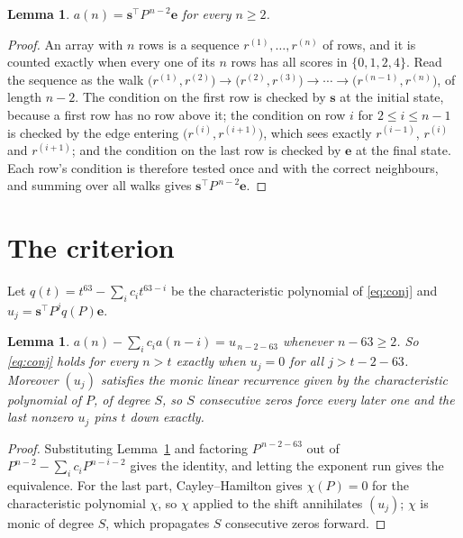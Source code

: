 \documentclass[11pt,a4paper]{article}
\theoremstyle{plain}
\newtheorem{lemma}[theorem]{Lemma}
\theoremstyle{definition}
\begin{document}
\begin{lemma}\label{lem:walk}
$a(n)=\mathbf{s}^{\!\top}P^{\,n-2}\mathbf{e}$ for every $n\ge2$.
\end{lemma}

\begin{proof}
An array with $n$ rows is a sequence $r^{(1)},\dots,r^{(n)}$ of rows, and it is counted
exactly when every one of its $n$ rows has all scores in $\{0,1,2,4\}$. Read the sequence as the
walk $\bigl(r^{(1)},r^{(2)}\bigr)\to\bigl(r^{(2)},r^{(3)}\bigr)\to\cdots\to
\bigl(r^{(n-1)},r^{(n)}\bigr)$, of length $n-2$. The condition on the first row is
checked by $\mathbf{s}$ at the initial state, because a first row has no row above it; the
condition on row $i$ for $2\le i\le n-1$ is checked by the edge entering
$\bigl(r^{(i)},r^{(i+1)}\bigr)$, which sees exactly $r^{(i-1)}$, $r^{(i)}$ and
$r^{(i+1)}$; and the condition on the last row is checked by $\mathbf{e}$ at the final
state. Each row's condition is therefore tested once and with the correct neighbours, and
summing over all walks gives $\mathbf{s}^{\!\top}P^{\,n-2}\mathbf{e}$.
\end{proof}

\section{The criterion}

Let $q(t)=t^{63}-\sum_i c_i t^{63-i}$ be the characteristic polynomial of
\eqref{eq:conj} and $u_j=\mathbf{s}^{\!\top}P^{j}q(P)\mathbf{e}$.

\begin{lemma}\label{lem:crit}
$a(n)-\sum_i c_i a(n-i)=u_{\,n-2-63}$ whenever $n-63\ge2$. So \eqref{eq:conj}
holds for every $n>t$ exactly when $u_j=0$ for all $j>t-2-63$. Moreover $(u_j)$
satisfies the monic linear recurrence given by the characteristic polynomial of $P$, of
degree $S$, so $S$ consecutive zeros force every later one and the last nonzero $u_j$ pins
$t$ down exactly.
\end{lemma}

\begin{proof}
Substituting Lemma~\ref{lem:walk} and factoring $P^{\,n-2-63}$ out of
$P^{n-2}-\sum_i c_i P^{n-i-2}$ gives the identity, and letting the exponent run gives the
equivalence. For the last part, Cayley--Hamilton gives $\chi(P)=0$ for the characteristic
polynomial $\chi$, so $\chi$ applied to the shift annihilates $(u_j)$; $\chi$ is monic of
degree $S$, which propagates $S$ consecutive zeros forward.
\end{proof}
\end{document}

